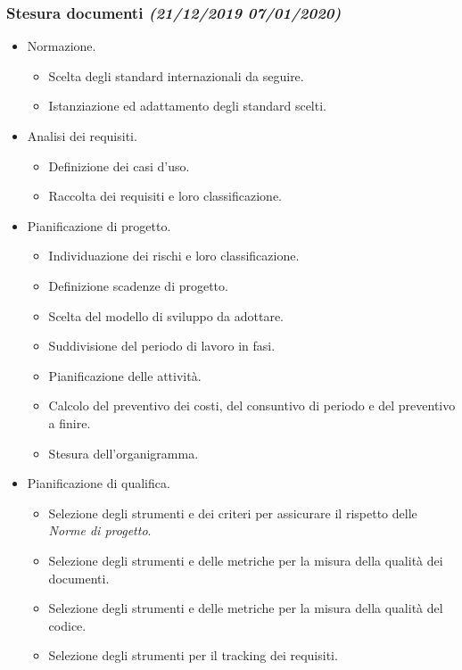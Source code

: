 \documentclass[../piano-di-progetto.tex]{subfiles}
\begin{document}
\subsubsection[Analisi e pianificazione]{Stesura documenti {\normalsize\normalfont\itshape(21/12/2019  07/01/2020)}}%
\label{subs:analisi_e_pianificazione}
\begin{itemize}
  \item Normazione.
  \begin{itemize}
    \item Scelta degli standard internazionali da seguire.
    \item Istanziazione ed adattamento degli standard scelti.
  \end{itemize}
  \item Analisi dei requisiti.
  \begin{itemize}
    \item Definizione dei casi d'uso.
    \item Raccolta dei requisiti e loro classificazione.
  \end{itemize}
  \item Pianificazione di progetto.
  \begin{itemize}
    \item Individuazione dei rischi e loro classificazione.
    \item Definizione scadenze di progetto.
    \item Scelta del modello di sviluppo da adottare.
    \item Suddivisione del periodo di lavoro in fasi.
    \item Pianificazione delle attività.
    \item Calcolo del preventivo dei costi, del consuntivo di periodo e del preventivo a finire.
    \item Stesura dell'organigramma.
  \end{itemize}
  \item Pianificazione di qualifica.
  \begin{itemize}
    \item Selezione degli strumenti e dei criteri per assicurare il rispetto delle \textit{Norme di progetto}.
    \item Selezione degli strumenti e delle metriche per la misura della qualità dei documenti.
    \item Selezione degli strumenti e delle metriche per la misura della qualità del codice.
    \item Selezione degli strumenti per il tracking dei requisiti.

\end{itemize}
\end{itemize}
\end{document}
